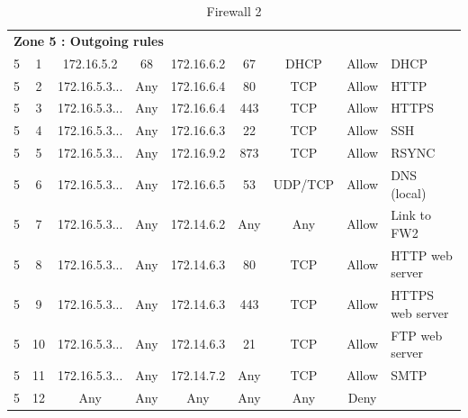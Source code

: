 \documentclass[a4paper,titlepage]{article}
\begin{document}
\begin{table}[h]
\begin{tabular}{c|c|cc|cc|ccl}
		\hline
		\multicolumn{9}{l}{\textbf{Zone 5 : Outgoing rules}}\\
		5 & 1 & 172.16.5.2 & 68 & 172.16.6.2 & 67 & DHCP & Allow & DHCP\\
		5 & 2 & 172.16.5.3... & Any & 172.16.6.4 & 80 & TCP & Allow & HTTP \\
		5 & 3 & 172.16.5.3... & Any & 172.16.6.4 & 443 & TCP & Allow & HTTPS \\
		5 & 4 & 172.16.5.3... & Any & 172.16.6.3 & 22 & TCP & Allow & SSH \\
		5 & 5 & 172.16.5.3... & Any & 172.16.9.2 & 873 & TCP & Allow & RSYNC \\
		5 & 6 & 172.16.5.3... & Any & 172.16.6.5 & 53 & UDP/TCP & Allow & DNS (local) \\
		5 & 7 & 172.16.5.3... & Any & 172.14.6.2 & Any & Any & Allow & Link to FW2 \\
		5 & 8 & 172.16.5.3... & Any & 172.14.6.3 & 80 & TCP & Allow & HTTP web server \\
		5 & 9 & 172.16.5.3... & Any & 172.14.6.3 & 443 & TCP & Allow & HTTPS web server \\
		5 & 10 & 172.16.5.3... & Any & 172.14.6.3 & 21 & TCP & Allow & FTP web server \\
		5 & 11 & 172.16.5.3... & Any & 172.14.7.2 & Any & TCP & Allow & SMTP \\

		5 & 12 & Any & Any & Any & Any & Any & Deny & \\


	\end{tabular}
	\caption{Firewall 2}
\end{table}


\end{document}
